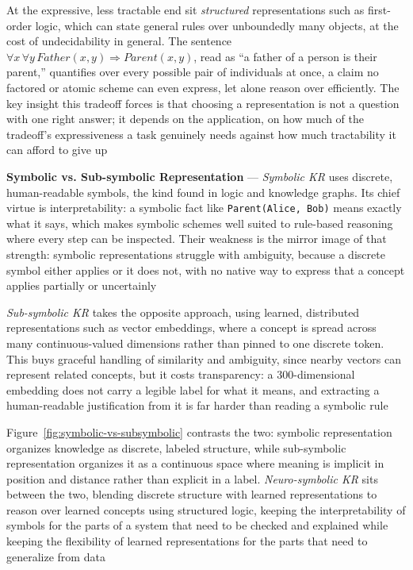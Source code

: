At the expressive, less tractable end sit \emph{structured} representations
such as first-order logic, which can state general rules over unboundedly
many objects, at the cost of undecidability in general. The sentence
$\forall x \, \forall y \, Father(x, y) \Rightarrow Parent(x, y)$, read as
``a father of a person is their parent,'' quantifies over every possible
pair of individuals at once, a claim no factored or atomic scheme can even
express, let alone reason over efficiently. The key insight this tradeoff
forces is that choosing a representation is not a question with one right
answer; it depends on the application, on how much of the tradeoff's
expressiveness a task genuinely needs against how much tractability it can
afford to give up

\textbf{Symbolic vs. Sub-symbolic Representation} --- \emph{Symbolic KR} uses
discrete, human-readable symbols, the kind found in logic and knowledge
graphs. Its chief virtue is interpretability: a symbolic fact like
\texttt{Parent(Alice, Bob)} means exactly what it says, which makes symbolic
schemes well suited to rule-based reasoning where every step can be
inspected. Their weakness is the mirror image of that strength: symbolic
representations struggle with ambiguity, because a discrete symbol either
applies or it does not, with no native way to express that a concept
applies partially or uncertainly

\emph{Sub-symbolic KR} takes the opposite approach, using learned,
distributed representations such as vector embeddings, where a concept is
spread across many continuous-valued dimensions rather than pinned to one
discrete token. This buys graceful handling of similarity and ambiguity,
since nearby vectors can represent related concepts, but it costs
transparency: a 300-dimensional embedding does not carry a legible label
for what it means, and extracting a human-readable justification from it
is far harder than reading a symbolic rule

Figure~\ref{fig:symbolic-vs-subsymbolic} contrasts the two: symbolic
representation organizes knowledge as discrete, labeled structure, while
sub-symbolic representation organizes it as a continuous space where
meaning is implicit in position and distance rather than explicit in a
label. \emph{Neuro-symbolic KR} sits between the two, blending discrete
structure with learned representations to reason over learned concepts
using structured logic, keeping the interpretability of symbols for the
parts of a system that need to be checked and explained while keeping the
flexibility of learned representations for the parts that need to
generalize from data

